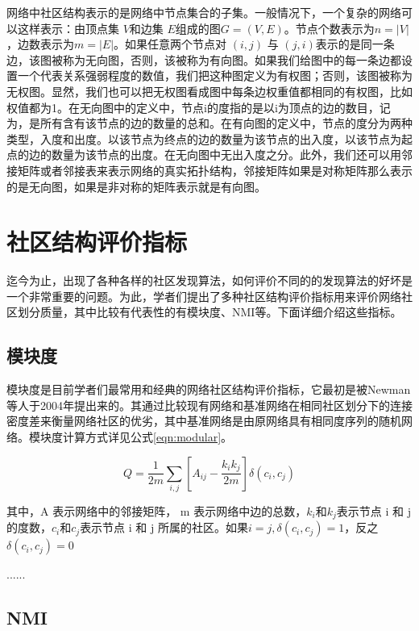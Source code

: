 网络中社区结构表示的是网络中节点集合的子集。一般情况下，一个复杂的网络可以这样表示：由顶点集 $V$和边集 $E$组成的图$G=(V,E)$。节点个数表示为$n=|V|$，边数表示为$m=|E|$。如果任意两个节点对 $(i, j)$ 与 $(j, i)$表示的是同一条边，该图被称为无向图，否则，该被称为有向图。如果我们给图中的每一条边都设置一个代表关系强弱程度的数值，我们把这种图定义为有权图；否则，该图被称为无权图。显然，我们也可以把无权图看成图中每条边权重值都相同的有权图，比如权值都为1。在无向图中的定义中，节点i的度指的是以i为顶点的边的数目，记为，是所有含有该节点的边的数量的总和。在有向图的定义中，节点的度分为两种类型，入度和出度。以该节点为终点的边的数量为该节点的出入度，以该节点为起点的边的数量为该节点的出度。在无向图中无出入度之分。此外，我们还可以用邻接矩阵或者邻接表来表示网络的真实拓扑结构，邻接矩阵如果是对称矩阵那么表示的是无向图，如果是非对称的矩阵表示就是有向图。

\section{社区结构评价指标}

迄今为止，出现了各种各样的社区发现算法，如何评价不同的的发现算法的好坏是一个非常重要的问题。为此，学者们提出了多种社区结构评价指标用来评价网络社区划分质量，其中比较有代表性的有模块度、NMI等。下面详细介绍这些指标。

\subsection{模块度}

模块度是目前学者们最常用和经典的网络社区结构评价指标，它最初是被Newman等人于2004年提出来的\cite{2002Community}。其通过比较现有网络和基准网络在相同社区划分下的连接密度差来衡量网络社区的优劣，其中基准网络是由原网络具有相同度序列的随机网络。模块度计算方式详见公式\ref{eqn:modular}。

\begin{equation}
  \label{eqn:modular}
  Q=\frac{1}{2m}\sum_{i,j}\left [ A_{ij}-\frac{k_ik_j}{2m} \right ]\delta (c_i, c_j)  
\end{equation}

其中，A 表示网络中的邻接矩阵， m 表示网络中边的总数，$k_i$和$k_j$表示节点 i 和 j 的度数，$c_i$和$c_j$表示节点 i 和 j 所属的社区。如果$i=j,\delta(c_i,c_j)=1$，反之$\delta(c_i,c_j)=0$

......

\subsection{NMI}

